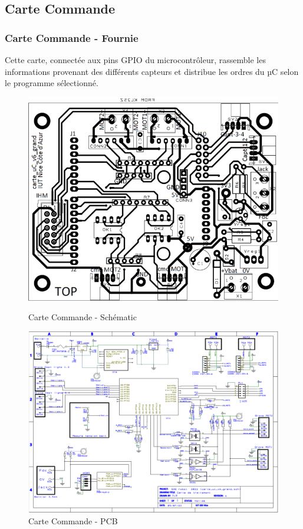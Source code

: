\subsection{Carte Commande}
\begin{frame}
    \frametitle{Carte Commande - Fournie}
    Cette carte, connectée aux pins GPIO du microcontrôleur, rassemble les informations provenant des différents capteurs et distribue les ordres du µC selon le programme sélectionné.

    \vfill
    \begin{figure}[H]
        \centering
        \begin{minipage}{.5\textwidth}
            \centering
            \includegraphics[width=.6\linewidth]{Images/carteCommande_pcb.png}
            \caption{Carte Commande - Schématic}
            \label{fig:commandesch}
        \end{minipage}%
        \begin{minipage}{.5\textwidth}
            \centering
            \includegraphics[width=.6\linewidth]{Images/carteCommande_sch.png}
            \caption{Carte Commande - PCB}
        \label{fig:commandepcb}
        \end{minipage}
    \end{figure}

\footer{\hfill\insertframenumber/\inserttotalframenumber}
\end{frame}